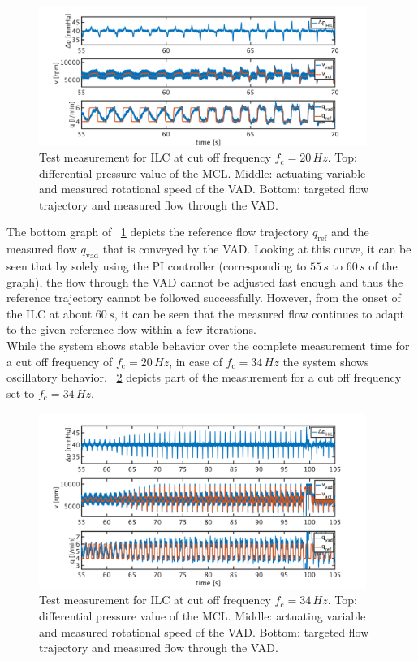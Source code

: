 \begin{figure}[ht]
  \centering
  \includegraphics[width=0.95\textwidth]{images/chapt_5/ILC/pi_to_ilc_fc_20.pdf}
  \caption[Test measurement for ILC at cut off frequency $f_{\mathrm{c}}=20\,Hz$]{Test measurement for ILC at cut off frequency $f_{\mathrm{c}}=20\,Hz$.  Top: differential pressure value of the MCL. Middle: actuating variable and measured rotational speed of the VAD. Bottom: targeted flow trajectory and measured flow through the VAD.}
  \label{fig:pi_to_ilc}
\end{figure}
The bottom graph of \figurename~\ref{fig:pi_to_ilc} depicts the reference flow trajectory $q_{\mathrm{ref}}$ and the measured flow $q_{\mathrm{vad}}$ that is conveyed by the VAD. Looking at this curve, it can be seen that by solely using the PI controller (corresponding to $55\,s$ to $60\,s$ of the graph), the flow through the VAD cannot be adjusted fast enough and thus the reference trajectory cannot be followed successfully. However, from the onset of the ILC at about $60\,s$, it can be seen that the measured flow continues to adapt to the given reference flow within a few iterations.
\\While the system shows stable behavior over the complete measurement time for a cut off frequency of $f_{\mathrm{c}}=20\,Hz$, in case of $f_{\mathrm{c}}=34\,Hz$ the system shows oscillatory behavior. \figurename~\ref{fig:pi_to_ilc_fc_34} depicts part of the measurement for a cut off frequency set to $f_{\mathrm{c}}=34\,Hz$.
\begin{figure}[ht]
  \centering
  \includegraphics[width=0.95\textwidth]{images/chapt_5/ILC/pi_to_ilc_fc_34.pdf}
  \caption[Test measurement for ILC at cut off frequency $f_{\mathrm{c}}=34\,Hz$]{Test measurement for ILC at cut off frequency $f_{\mathrm{c}}=34\,Hz$. Top: differential pressure value of the MCL. Middle: actuating variable and measured rotational speed of the VAD. Bottom: targeted flow trajectory and measured flow through the VAD.}
  \label{fig:pi_to_ilc_fc_34}
\end{figure}
